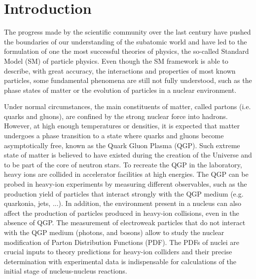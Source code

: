 \let\textcircled=\pgftextcircled
\chapter*{Introduction} \label{sec:Introduction}

The progress made by the scientific community over the last century have pushed the boundaries of our understanding of the subatomic world and have led to the formulation of one the most successful theories of physics, the so-called Standard Model (SM) of particle physics. Even though the SM framework is able to describe, with great accuracy, the interactions and properties of most known particles,  some fundamental phenomena are still not fully understood, such as the phase states of matter or the evolution of particles in a nuclear environment.

Under normal circumstances, the main constituents of matter, called partons (i.e. quarks and gluons), are confined by the strong nuclear force into hadrons. However, at high enough temperatures or densities, it is expected that matter undergoes a phase transition to a state where quarks and gluons become asymptotically free, known as the Quark Gluon Plasma (QGP). Such extreme state of matter is believed to have existed during the creation of the Universe and to be part of the core of neutron stars. To recreate the QGP in the laboratory, heavy ions are collided in accelerator facilities at high energies. The QGP can be probed in heavy-ion experiments by measuring different observables, such as the production yield of particles that interact strongly with the QGP medium (e.g. quarkonia, jets, ...). In addition, the environment present in a nucleus can also affect the production of particles produced in heavy-ion collisions, even in the absence of QGP. The measurement of electroweak particles that do not interact with the QGP medium (photons, \Z and \Wb bosons) allow to study the nuclear modification of Parton Distribution Functions (PDF). The PDFs of nuclei are crucial inputs to theory predictions for heavy-ion colliders and their precise determination with experimental data is indispensable for calculations of the initial stage of nucleus-nucleus reactions.

